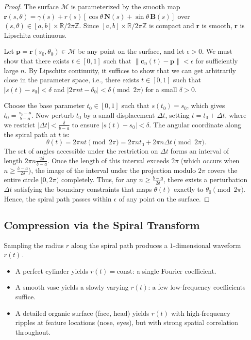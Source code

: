 \documentclass[11pt,twoside]{article}
\begin{document}
\begin{proof}
	The surface $\mathcal{M}$ is parameterized by the smooth map $\mathbf{r}(s, \theta) = \gamma(s) + r(s)[\cos\theta \, \mathbf{N}(s) + \sin\theta \, \mathbf{B}(s)]$ over $(s, \theta) \in [a, b] \times \mathbb{R}/2\pi\mathbb{Z}$. Since $[a, b] \times \mathbb{R}/2\pi\mathbb{Z}$ is compact and $\mathbf{r}$ is smooth, $\mathbf{r}$ is Lipschitz continuous.
	
	Let $\mathbf{p} = \mathbf{r}(s_0, \theta_0) \in \mathcal{M}$ be any point on the surface, and let $\epsilon > 0$. We must show that there exists $t \in [0,1]$ such that $\|\mathbf{c}_n(t) - \mathbf{p}\| < \epsilon$ for sufficiently large $n$. By Lipschitz continuity, it suffices to show that we can get arbitrarily close in the parameter space, i.e., there exists $t \in [0,1]$ such that $|s(t) - s_0| < \delta$ and $|2\pi n t - \theta_0| < \delta \pmod{2\pi}$ for a small $\delta > 0$.
	
	Choose the base parameter $t_0 \in [0, 1]$ such that $s(t_0) = s_0$, which gives $t_0 = \frac{s_0 - a}{b - a}$. Now perturb $t_0$ by a small displacement $\Delta t$, setting $t = t_0 + \Delta t$, where we restrict $|\Delta t| < \frac{\delta}{b - a}$ to ensure $|s(t) - s_0| < \delta$. The angular coordinate along the spiral path at $t$ is:
	\begin{equation}
		\theta(t) = 2\pi n t \pmod{2\pi} = 2\pi n t_0 + 2\pi n \Delta t \pmod{2\pi}.
	\end{equation}
	The set of angles accessible under the restriction on $\Delta t$ forms an interval of length $2\pi n \frac{2\delta}{b-a}$. Once the length of this interval exceeds $2\pi$ (which occurs when $n \geq \frac{b-a}{2\delta}$), the image of the interval under the projection modulo $2\pi$ covers the entire circle $[0, 2\pi)$ completely. Thus, for any $n \geq \frac{b-a}{2\delta}$, there exists a perturbation $\Delta t$ satisfying the boundary constraints that maps $\theta(t)$ exactly to $\theta_0 \pmod{2\pi}$. Hence, the spiral path passes within $\epsilon$ of any point on the surface.
\end{proof}

\subsection{Compression via the Spiral Transform}

Sampling the radius $r$ along the spiral path produces a $1$-dimensional waveform $r(t)$.

\begin{itemize}
	\item A perfect cylinder yields $r(t) = \text{const}$: a single Fourier coefficient.
	\item A smooth vase yields a slowly varying $r(t)$: a few low-frequency coefficients suffice.
	\item A detailed organic surface (face, head) yields $r(t)$ with high-frequency ripples at feature locations (nose, eyes), but with strong spatial correlation throughout.
\end{itemize}
\end{document}
